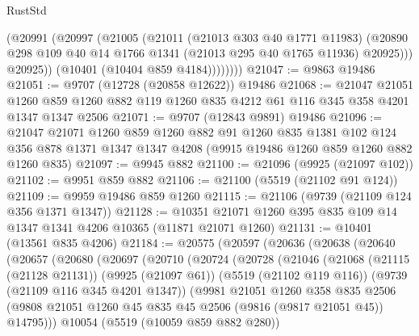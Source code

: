 \begin{lexlean}{RustStd}
\begin{coremodule}
                (@20991
                  (@20997
                    (@21005
                      (@21011
                        (@21013 @303 @40 @1771 @11983)
                        (@20890
                          @298
                          @109
                          @40
                          @14
                          @1766
                          @1341
                          (@21013 @295 @40 @1765 @11936)
                          @20925)))
                    @20925))
                (@10401 (@10404 @859 @4184))))))))
@21047 := @9863 @19486
@21051 := @9707 (@12728 (@20858 @12622)) @19486
@21068 := @21047
    @21051
    @1260
    @859
    @1260
    @882
    @119
    @1260
    @835
    @4212
    @61
    @116
    @345
    @358
    @4201
    @1347
    @1347
    @2506
@21071 := @9707 (@12843 @9891) @19486
@21096 := @21047
    @21071
    @1260
    @859
    @1260
    @882
    @91
    @1260
    @835
    @1381
    @102
    @124
    @356
    @878
    @1371
    @1347
    @1347
    @4208
    (@9915 @19486 @1260 @859 @1260 @882 @1260 @835)
@21097 := @9945 @882
@21100 := @21096 (@9925 (@21097 @102))
@21102 := @9951 @859 @882
@21106 := @21100 (@5519 (@21102 @91 @124))
@21109 := @9959 @19486 @859 @1260
@21115 := @21106 (@9739 (@21109 @124 @356 @1371 @1347))
@21128 := @10351 @21071 @1260 @395 @835 @109 @14 @1347 @1341 @4206 @10365 (@11871 @21071 @1260)
@21131 := @10401 (@13561 @835 @4206)
@21184 := @20575
    (@20597
      (@20636
        (@20638
          (@20640
            (@20657
              (@20680
                (@20697
                  (@20710
                    (@20724
                      (@20728
                        (@21046
                          (@21068
                            (@21115 (@21128 @21131))
                            (@9925 (@21097 @61))
                            (@5519 (@21102 @119 @116))
                            (@9739 (@21109 @116 @345 @4201 @1347))
                            (@9981
                              @21051
                              @1260
                              @358
                              @835
                              @2506
                              (@9808
                                @21051
                                @1260
                                @45
                                @835
                                @45
                                @2506
                                (@9816 (@9817 @21051 @45))
                                @14795)))
                          @10054
                          (@5519 (@10059 @859 @882 @280))

\end{coremodule}
\end{lexlean}
